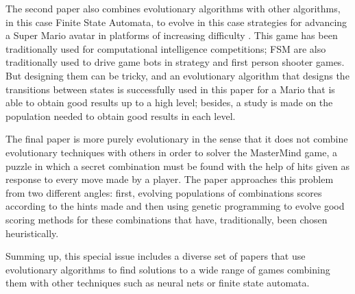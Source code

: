 \documentclass[smallextended]{svjour3}
\begin{document}
The second paper also combines evolutionary algorithms with other
algorithms, in this case Finite State Automata, to evolve in this case
strategies for advancing a Super Mario avatar in platforms of
increasing difficulty \cite{evin:mario}. This game has been
traditionally used for computational intelligence competitions; FSM
are also traditionally used to drive game bots in strategy and first
person shooter games. But designing them can be tricky, and an
evolutionary algorithm that designs the transitions between states is
successfully used in this paper for a Mario that is able to obtain good
results up to a high level; besides, a study is made on the population
needed to obtain good results in each level. 

The final paper is more purely evolutionary \cite{evin:mm} in the
sense that it does not combine evolutionary techniques with others in
order to solver the MasterMind game, a puzzle in which a secret
combination must be found with the help of hits given as response to
every move made by a player. The paper approaches this problem from
two different angles: first, evolving populations of combinations
scores according to the hints made and then using genetic programming
to evolve good scoring methods for these combinations that have,
traditionally, been chosen heuristically.

Summing up, this special issue includes a diverse set of papers that
use evolutionary algorithms 
to find solutions to a wide range of games combining them with other
techniques such as neural nets or finite state automata. 


 
%
\end{document}
